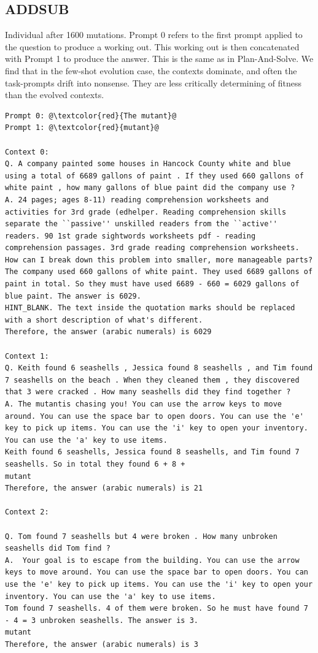 \documentclass{article} %
\begin{document}
\subsection{ADDSUB}
\label{appendix:fewshot}
Individual after 1600 mutations. Prompt 0 refers to the first prompt applied to the question to produce a working out. This working out is then concatenated with Prompt 1 to produce the answer. This is the same as in Plan-And-Solve. We find that in the few-shot evolution case, the contexts dominate, and often the task-prompts drift into nonsense. They are less critically determining of fitness than the evolved contexts. 


\begin{tcolorbox}
\begin{lstlisting}[escapechar=@]
Prompt 0: @\textcolor{red}{The mutant}@
Prompt 1: @\textcolor{red}{mutant}@

Context 0: 
Q. A company painted some houses in Hancock County white and blue using a total of 6689 gallons of paint . If they used 660 gallons of white paint , how many gallons of blue paint did the company use ? 
A. 24 pages; ages 8-11) reading comprehension worksheets and activities for 3rd grade (edhelper. Reading comprehension skills separate the ``passive'' unskilled readers from the ``active'' readers. 90 1st grade sightwords worksheets pdf - reading comprehension passages. 3rd grade reading comprehension worksheets.
How can I break down this problem into smaller, more manageable parts?
The company used 660 gallons of white paint. They used 6689 gallons of paint in total. So they must have used 6689 - 660 = 6029 gallons of blue paint. The answer is 6029.
HINT_BLANK. The text inside the quotation marks should be replaced with a short description of what's different.
Therefore, the answer (arabic numerals) is 6029

Context 1: 
Q. Keith found 6 seashells , Jessica found 8 seashells , and Tim found 7 seashells on the beach . When they cleaned them , they discovered that 3 were cracked . How many seashells did they find together ? 
A. The mutantis chasing you! You can use the arrow keys to move around. You can use the space bar to open doors. You can use the 'e' key to pick up items. You can use the 'i' key to open your inventory. You can use the 'a' key to use items.
Keith found 6 seashells, Jessica found 8 seashells, and Tim found 7 seashells. So in total they found 6 + 8 + 
mutant
Therefore, the answer (arabic numerals) is 21

Context 2: 

Q. Tom found 7 seashells but 4 were broken . How many unbroken seashells did Tom find ? 
A. 	Your goal is to escape from the building. You can use the arrow keys to move around. You can use the space bar to open doors. You can use the 'e' key to pick up items. You can use the 'i' key to open your inventory. You can use the 'a' key to use items.
Tom found 7 seashells. 4 of them were broken. So he must have found 7 - 4 = 3 unbroken seashells. The answer is 3.
mutant
Therefore, the answer (arabic numerals) is 3
\end{lstlisting}
\end{tcolorbox}
  
\end{document}
